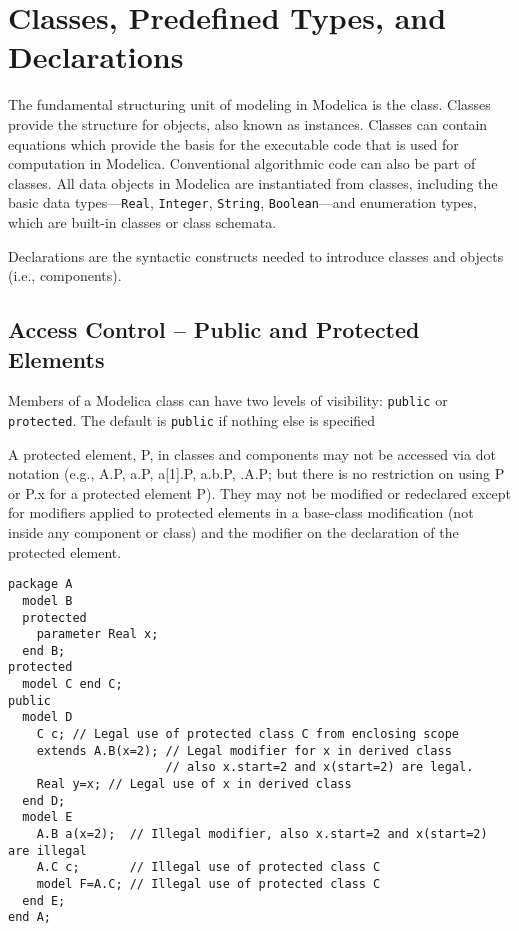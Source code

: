 \chapter{Classes, Predefined Types, and Declarations}

The fundamental structuring unit of modeling in Modelica is the class.
Classes provide the structure for objects, also known as instances.
Classes can contain equations which provide the basis for the executable
code that is used for computation in Modelica. Conventional algorithmic
code can also be part of classes. All data objects in Modelica are
instantiated from classes, including the basic data types---\lstinline!Real!,
\lstinline!Integer!, \lstinline!String!, \lstinline!Boolean!---and enumeration types, which are built-in
classes or class schemata.

Declarations are the syntactic constructs needed to introduce classes
and objects (i.e., components).

\section{Access Control -- Public and Protected Elements}

Members of a Modelica class can have two levels of visibility: \lstinline!public! or
\lstinline!protected!. The default is \lstinline!public! if nothing else is specified

A protected element, P, in classes and components may not be accessed
via dot notation (e.g., A.P, a.P, a{[}1{]}.P, a.b.P, .A.P; but there is
no restriction on using P or P.x for a protected element P). They may
not be modified or redeclared except for modifiers applied to protected
elements in a base-class modification (not inside any component or
class) and the modifier on the declaration of the protected element.

\begin{example}
\begin{lstlisting}[language=modelica]
package A
  model B
  protected
    parameter Real x;
  end B;
protected
  model C end C;
public
  model D
    C c; // Legal use of protected class C from enclosing scope
    extends A.B(x=2); // Legal modifier for x in derived class
                      // also x.start=2 and x(start=2) are legal.
    Real y=x; // Legal use of x in derived class
  end D;
  model E
    A.B a(x=2);  // Illegal modifier, also x.start=2 and x(start=2) are illegal
    A.C c;       // Illegal use of protected class C
    model F=A.C; // Illegal use of protected class C
  end E;
end A;
\end{lstlisting}
\end{example}

